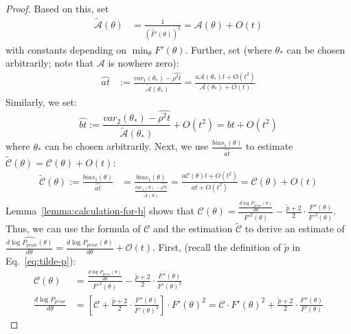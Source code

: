\begin{proof}
Based on this, set
    \begin{align*}
        \tilde{\mathcal{A}}(\theta) &= \frac{1}{\left(\widehat{F}'(\theta)\right)^2} = \mathcal{A}(\theta) + O(t)
        \end{align*}
        with constants depending on $\min_\theta F'(\theta)$.
        Further, set (where $\theta_*$ can be chosen arbitrarily; note that $\mathcal{A}$ is nowhere zero):
        \begin{align*}
        \widehat{at} &:= \frac{var_1(\theta_*) - \widehat{\rho^2t}}{\tilde{\mathcal{A}}(\theta_*)}
        = \frac{a\mathcal{A}(\theta_*)t+O(t^2)}{\mathcal{A}(\theta_*)+O(t)}
    \end{align*}
    Similarly, we set:
    \begin{equation*}
        \widehat{bt} := \frac{var_2(\theta_*) - \widehat{\rho^2t}}{\tilde{\mathcal{A}}(\theta_*)} +O(t^2) = bt + O(t^2)
    \end{equation*}
    where $\theta_*$ can be chosen arbitrarily.
    Next, we use $\frac{bias_1(\theta)}{\widehat{at}}$ to estimate $\tilde{\mathcal{C}}(\theta)= \mathcal{C}(\theta) +O(t)$:
    \begin{align*}
        \tilde{\mathcal{C}}(\theta) := \frac{bias_1(\theta)}{\widehat{at}} &= \frac{bias_1(\theta)}{\frac{var_1(\theta) - \widehat{\rho^2t}}{\tilde{\mathcal{A}}(\theta)}}
        = \frac{a\mathcal{C}(\theta)t + O(t^2)}{at + O(t^2)}
        = \mathcal{C}(\theta) + O(t)
\end{align*}
Lemma~\ref{lemma:calculation-for-b} shows that $\mathcal{C}(\theta) = \frac{\frac{d \log P_{prior}(\theta)}{d \theta}}{F'^2(\theta)} - \frac{\tilde{p}+2}{2} \cdot \frac{F''(\theta)}{F'^3(\theta)}$.
    Thus, we can use the formula of $\mathcal{C}$ and the estimation $\tilde{\mathcal{C}}$ to derive an estimate of $\widehat{\frac{d \log P_{prior}(\theta)}{d \theta}} = \frac{d \log P_{prior}(\theta)}{d \theta} + \mathcal{O}(t)$. 
    First, (recall the definition of $\tilde{p}$ in Eq.~\ref{eq:tilde-p}):
    \begin{align*}
        \mathcal{C}(\theta) &= \frac{\frac{d \log P_{prior}(\theta)}{d \theta}}{F'^2(\theta)} - \frac{\tilde{p}+2}{2} \cdot \frac{F''(\theta)}{F'(\theta)^3}\\
        \frac{d \log P_{prior}}{d \theta} &= [\mathcal{C} + \frac{\tilde{p}+2}{2} \cdot \frac{F''(\theta)}{F'(\theta)^3}] \cdot F'(\theta)^2 
        =\mathcal{C} \cdot F'(\theta)^2 + \frac{\tilde{p}+2}{2} \cdot \frac{F''(\theta)}{F'(\theta)}
        \end{align*}


\end{proof}
